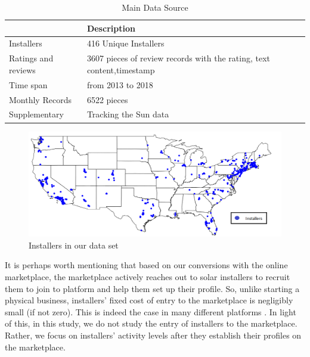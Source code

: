 \documentclass[msom,blindrev]{informs3}
\begin{document}
\begin{table}[]
\centering
\begin{tabular}{@{}ll@{}}
\toprule
           & Description           \\ \midrule
Installers & 416 Unique Installers \\
Ratings and reviews & 3607 pieces of review records with the rating, text content,timestamp \\
Time span  & from 2013 to 2018     \\
Monthly Records & 6522 pieces \\
Supplementary & Tracking the Sun data \\
\bottomrule
\end{tabular}
\caption{Main Data Source}
\label{brief_data_desc}
\end{table}






\begin{figure}
	\centering
	\includegraphics[width=1.1\linewidth]{national_installers.png}
	\caption{Installers in our data set}
	\label{fig: nationalinstallers}
\end{figure}

It is perhaps worth mentioning that based on our conversions with the online marketplace, the marketplace actively reaches out to solar installers to recruit them to join to platform and help them set up their profile. So, unlike starting a physical business, installers' fixed cost of entry to the marketplace is negligibly small (if not zero). This is indeed the case in many different platforms \citep{haddad2015consumer}. In light of this, in this study, we do not study the entry of installers to the marketplace. Rather, we focus on installers' activity levels after they establish their profiles on the marketplace.


\end{document}
